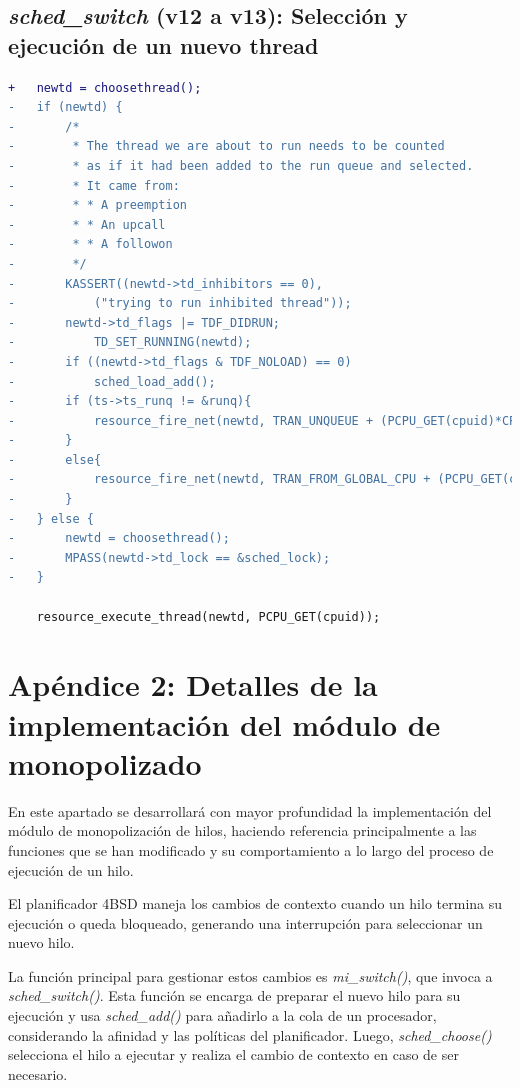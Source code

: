 \subsection{\textit{sched\_switch} (v12 a v13): Selección y ejecución de un nuevo thread}\label{appendix:apA3}

\begin{lstlisting}[language=diff]
+   newtd = choosethread();
-   if (newtd) {
-       /*
-        * The thread we are about to run needs to be counted
-        * as if it had been added to the run queue and selected.
-        * It came from:
-        * * A preemption
-        * * An upcall
-        * * A followon
-        */
-       KASSERT((newtd->td_inhibitors == 0),
-           ("trying to run inhibited thread"));
-       newtd->td_flags |= TDF_DIDRUN;
-           TD_SET_RUNNING(newtd);
-       if ((newtd->td_flags & TDF_NOLOAD) == 0)
-           sched_load_add();
-       if (ts->ts_runq != &runq){
-           resource_fire_net(newtd, TRAN_UNQUEUE + (PCPU_GET(cpuid)*CPU_BASE_TRANSITIONS));
-       }
-       else{
-           resource_fire_net(newtd, TRAN_FROM_GLOBAL_CPU + (PCPU_GET(cpuid)*CPU_BASE_TRANSITIONS));
-       }
-   } else {
-       newtd = choosethread();
-       MPASS(newtd->td_lock == &sched_lock);
-   }

    resource_execute_thread(newtd, PCPU_GET(cpuid));

\end{lstlisting}

\section{Apéndice 2: Detalles de la implementación del módulo de monopolizado}\label{appendix:apB}

En este apartado se desarrollará con mayor profundidad la implementación del módulo de monopolización de hilos, haciendo referencia principalmente a las funciones que se han modificado y su comportamiento a lo largo del proceso de ejecución de un hilo.

El planificador 4BSD maneja los cambios de contexto cuando un hilo termina su ejecución o queda bloqueado, generando una interrupción para seleccionar un nuevo hilo.

La función principal para gestionar estos cambios es \textit{mi\_switch()}, que invoca a \textit{sched\_switch()}. Esta función se encarga de preparar el nuevo hilo para su ejecución y usa \textit{sched\_add()} para añadirlo a la cola de un procesador, considerando la afinidad y las políticas del planificador. Luego, \textit{sched\_choose()} selecciona el hilo a ejecutar y realiza el cambio de contexto en caso de ser necesario.

